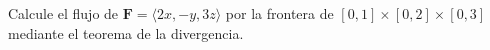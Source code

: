 ﻿Calcule el flujo de $\mathbf F=\langle2x,-y,3z\rangle$ por la frontera de $[0,1]\times[0,2]\times[0,3]$ mediante el teorema de la divergencia.
